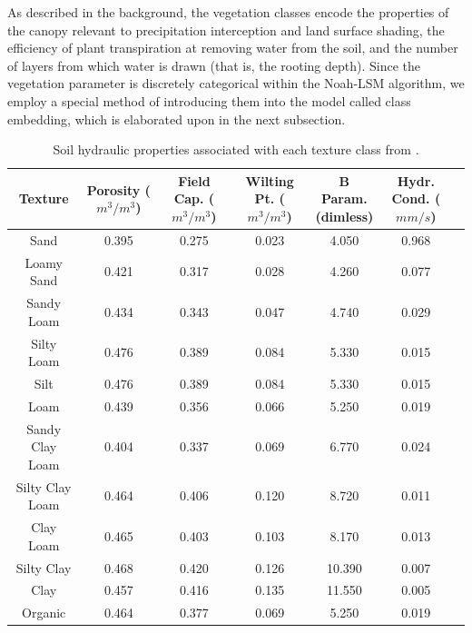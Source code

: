 As described in the background, the vegetation classes encode the properties of the canopy relevant to precipitation interception and land surface shading, the efficiency of plant transpiration at removing water from the soil, and the number of layers from which water is drawn (that is, the rooting depth). Since the vegetation parameter is discretely categorical within the Noah-LSM algorithm, we employ a special method of introducing them into the model called class embedding, which is elaborated upon in the next subsection.

\begin{table}[H]
    \centering
    \scriptsize
    \begin{tabular}{c|c|c|c|c|c|c }
Texture & \thead{Porosity \\ ($m^3/m^3$)} & \thead{Field Cap. \\ ($m^3/m^3$)} & \thead{Wilting Pt. \\ ($m^3/m^3$)} & \thead{B Param. \\ (dimless)} & \thead{Hydr. Cond. \\ ($mm/s$)}\\
\hline
Sand & 0.395 & 0.275 & 0.023 & 4.050 & 0.968 \\
Loamy Sand & 0.421 & 0.317 & 0.028 & 4.260 & 0.077 \\
Sandy Loam & 0.434 & 0.343 & 0.047 & 4.740 & 0.029 \\
Silty Loam & 0.476 & 0.389 & 0.084 & 5.330 & 0.015 \\
Silt & 0.476 & 0.389 & 0.084 & 5.330 & 0.015 \\
Loam & 0.439 & 0.356 & 0.066 & 5.250 & 0.019 \\
Sandy Clay Loam & 0.404 & 0.337 & 0.069 & 6.770 & 0.024 \\
Silty Clay Loam & 0.464 & 0.406 & 0.120 & 8.720 & 0.011 \\
Clay Loam & 0.465 & 0.403 & 0.103 & 8.170 & 0.013 \\
Silty Clay & 0.468 & 0.420 & 0.126 & 10.390 & 0.007 \\
Clay & 0.457 & 0.416 & 0.135 & 11.550 & 0.005 \\
Organic & 0.464 & 0.377 & 0.069 & 5.250 & 0.019 \\
\end{tabular}
    \caption{Soil hydraulic properties associated with each texture class from \citep{cosby_statistical_1984}.}
    \label{soil-texture-table}
\end{table}

